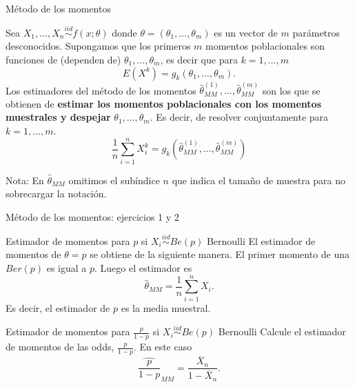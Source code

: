 \documentclass{beamer}
\theoremstyle{definition}
\begin{document}
\begin{frame}{\color{rosee}M\'etodo de los momentos}
  
    Sea $X_{1},\dots, X_{n}\stackrel{iid}{\sim}f(x;\theta)$
    donde $\theta=(\theta_1,\dots,\theta_m)$ es un vector de $m$ par\'ametros  desconocidos. Supongamos que los primeros $m$ momentos poblacionales
    son funciones de (dependen de) $\theta_{1},\dots,\theta_{m}$, es decir que para
    $k=1,\dots,m$
    \[ E\left(X^{k}\right)=g_{k}(\theta_{1},\dots,\theta_{m}).\]
    Los estimadores del m\'etodo de los momentos
    $\widehat{\theta}^{(1)}_{MM},\dots,\widehat{\theta}^{(m)}_{MM}$ son
    los que se obtienen de \textbf{estimar los momentos poblacionales con los momentos muestrales y despejar} $\theta_{1},\dots,\theta_{m}$. Es
    decir, de resolver conjuntamente para $k=1,\dots,m$.
    \[ \frac{1}{n}\sum_{i=1}^{n}X_{i}^{k}=g_{k}\left(\widehat{\theta}^{(1)}_{MM},\dots,\widehat{\theta}^{(m)}_{MM}\right)\]
 
 \medskip
 
   Nota: En $\widehat{\theta}_{MM}$ omitimos el sub\'indice $n$ que indica el
  tama\~no de muestra para no sobrecargar la notaci\'on.
\end{frame}



\begin{frame}{\color{rosee}M\'etodo de los momentos: ejercicios 1 y 2}
  \begin{exampleblock}{Estimador de momentos para $p$ si $X_i\stackrel{iid}{\sim} Be(p)$ Bernoulli}
   El estimador de momentos de $\theta=p$ se obtiene de la
    siguiente manera. El primer momento de una $Ber(p)$ 
    es igual a $p$. 
    Luego el estimador es
    \[\widehat{\theta}_{MM}=\frac{1}{n}\sum\limits_{i=1}^{n}X_{i}.\]
    Es decir, el estimador de $p$ es la media muestral.
  \end{exampleblock}

\begin{exampleblock}{Estimador de momentos para $\frac{p}{1-p}$ si $X_i\stackrel{iid}{\sim} Be(p)$ Bernoulli}
 Calcule el estimador de momentos de las odds, $\frac{p}{1-p}$.
 En este caso \[\widehat{\frac{p}{1-p}}_{MM}=\frac{\overline{X}_n}{1-\overline{X}_n}.\]
\end{exampleblock}
\end{frame}
\end{document}
